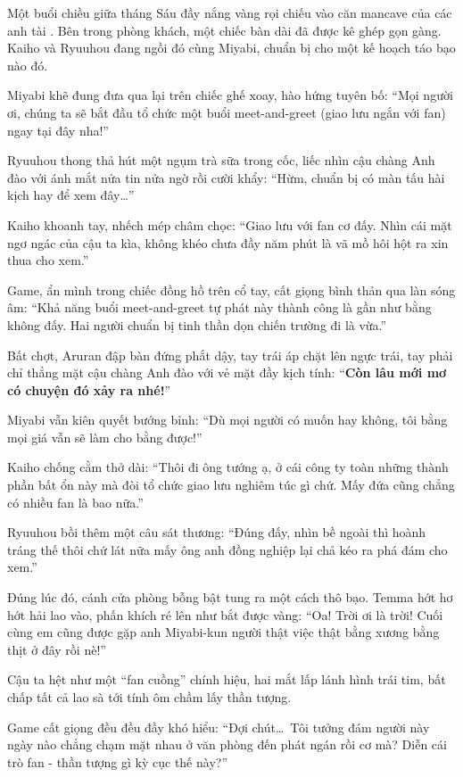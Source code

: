 \documentclass[../main.tex]{subfiles}
\begin{document}
Một buổi chiều giữa tháng Sáu đầy nắng vàng rọi chiếu vào căn mancave của các anh tài \hls. Bên trong phòng khách, một chiếc bàn dài đã được kê ghép gọn gàng. Kaiho và Ryuuhou đang ngồi đó cùng Miyabi, chuẩn bị cho một kế hoạch táo bạo nào đó.

Miyabi khẽ đung đưa qua lại trên chiếc ghế xoay, hào hứng tuyên bố: ``Mọi người ơi, chúng ta sẽ bắt đầu tổ chức một buổi meet-and-greet (giao lưu ngắn với fan) ngay tại đây nha!''

Ryuuhou thong thả hút một ngụm trà sữa trong cốc, liếc nhìn cậu chàng Anh đào với ánh mắt nửa tin nửa ngờ rồi cười khẩy: ``Hừm, chuẩn bị có màn tấu hài kịch hay để xem đây\dots''

Kaiho khoanh tay, nhếch mép châm chọc: ``Giao lưu với fan cơ đấy. Nhìn cái mặt ngơ ngác của cậu ta kìa, không khéo chưa đầy năm phút là vã mồ hôi hột ra xin thua cho xem.''

Game, ẩn mình trong chiếc đồng hồ trên cổ tay, cất giọng bình thản qua làn sóng âm: ``Khả năng buổi meet-and-greet tự phát này thành công là gần như bằng không đấy. Hai người chuẩn bị tinh thần dọn chiến trường đi là vừa.''

Bất chợt, Aruran đập bàn đứng phắt dậy, tay trái áp chặt lên ngực trái, tay phải chỉ thẳng mặt cậu chàng Anh đào với vẻ mặt đầy kịch tính: ``\textbf{Còn lâu mới mơ có chuyện đó xảy ra nhé!}''


Miyabi vẫn kiên quyết bướng bỉnh: ``Dù mọi người có muốn hay không, tôi bằng mọi giá vẫn sẽ làm cho bằng được!''

Kaiho chống cằm thở dài: ``Thôi đi ông tướng ạ, ở cái công ty toàn những thành phần bất ổn này mà đòi tổ chức giao lưu nghiêm túc gì chứ. Mấy đứa cũng chẳng có nhiều fan là bao nữa.''

Ryuuhou bồi thêm một câu sát thương: ``Đúng đấy, nhìn bề ngoài thì hoành tráng thế thôi chứ lát nữa mấy ông anh đồng nghiệp lại chả kéo ra phá đám cho xem.''

Đúng lúc đó, cánh cửa phòng bỗng bật tung ra một cách thô bạo. Temma hớt hơ hớt hải lao vào, phấn khích ré lên như bắt được vàng: ``Oa! Trời ơi là trời! Cuối cùng em cũng được gặp anh Miyabi-kun người thật việc thật bằng xương bằng thịt ở đây rồi nè!''

Cậu ta hệt như một ``fan cuồng'' chính hiệu, hai mắt lấp lánh hình trái tim, bất chấp tất cả lao sà tới tính ôm chầm lấy thần tượng.

Game cất giọng đều đều đầy khó hiểu: ``Đợi chút\dots\ Tôi tưởng đám người này ngày nào chẳng chạm mặt nhau ở văn phòng đến phát ngán rồi cơ mà? Diễn cái trò fan - thần tượng gì kỳ cục thế này?''
\end{document}
